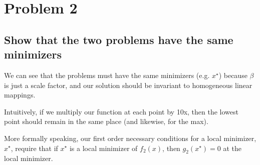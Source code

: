 \documentclass{article}
\begin{document}





\section{Problem 2}

\subsection{Show that the two problems have the same minimizers}

We can see that the problems must have the same minimizers
(e.g. $x^\star$) because $\beta$ is just a scale factor, and our solution
should be invariant to homogeneous linear mappings. 

Intuitively, if we multiply our function at each point by 10x, then 
the lowest point should remain in the same place (and likewise, for the
max). 

More formally speaking, our first order necessary conditions for a local
minimizer, $x^\star$, require that if $x^\star$ is a local minimizer of
$f_2(x)$, then $g_2(x^\star) = 0 $ at the local minimizer. 
\end{document}
